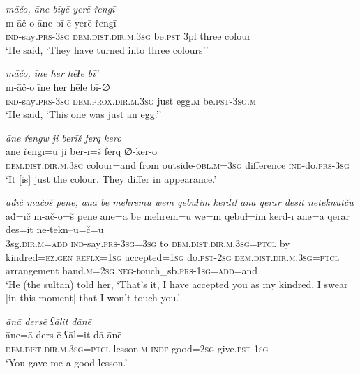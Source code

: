 \ea \label{ŽH.89}
\textit{māčo, āne bīyē yerē řengī} \\ 
\gll m-āč-o āne bī-ē yerē řengī \\ 
 \textsc{ind-}say\textsc{.prs}\textsc{-3sg} \textsc{dem.dist}\textsc{.dir}\textsc{.m}\textsc{.3sg} be\textsc{.pst} 3pl three colour \\ 
\glt `He said, ‘They have turned into three colours’'
\z 
 
\ea \label{ŽH.95}
\textit{māčo, īne her hēɫe bī’} \\ 
\gll m-āč-o īne her hēɫe bī-∅ \\ 
 \textsc{ind-}say\textsc{.prs}\textsc{-3sg} \textsc{dem.prox}\textsc{.dir}\textsc{.m}\textsc{.3sg} just egg\textsc{.m} be\textsc{.pst}\textsc{-3sg}\textsc{.m} \\ 
\glt `He said, ‘This one was just an egg.’'
\z 
 
\ea \label{ŽH.100}
\textit{āne řengw ji berīš ferq kero} \\ 
\gll āne řengī=ū ji ber-ī=š ferq ∅-ker-o \\ 
 \textsc{dem.dist}\textsc{.dir}\textsc{.m}\textsc{.3sg} colour=and from outside\textsc{-obl}\textsc{.m}\textsc{=3sg} difference \textsc{ind-}do\textsc{.prs}\textsc{-3sg} \\ 
\glt `It [is] just the colour. They differ in appearance.'
\z 
 
\ea \label{ŽH.103}
\textit{āđīč māčoš pene, ānā be mehremū wēm qebūɫim kerdī! ānā qerār desit neteknūtčū} \\ 
\gll āđ=īč m-āč-o=š pene āne=ā be mehrem=ū wē=m qebūɫ=im kerd-ī āne=ā qerār des=it ne-tekn--ū=č=ū \\ 
 3sg\textsc{.dir}\textsc{.m}\textsc{=add} \textsc{ind-}say\textsc{.prs}\textsc{-3sg}\textsc{=3sg} to \textsc{dem.dist}\textsc{.dir}\textsc{.m}\textsc{.3sg}=\textsc{ptcl} by kindred\textsc{=ez}\textsc{.gen} \textsc{reflx}\textsc{=1sg} accepted\textsc{=1sg} do\textsc{.pst}-\textsc{2sg} \textsc{dem.dist}\textsc{.dir}\textsc{.m}\textsc{.3sg}=\textsc{ptcl} arrangement hand\textsc{.m}\textsc{=\textsc{2sg}} \textsc{neg-}touch\_sb\textsc{.prs}\textsc{-1sg}\textsc{=add}=and \\ 
\glt `He (the sultan) told her, ‘That’s it, I have accepted you as my kindred. I swear [in this moment] that I won’t touch you.'
\z 
 
\ea \label{ŽH.104}
\textit{ānā dersē ʕālit dānē} \\ 
\gll āne=ā ders-ē ʕāl=it dā-ānē \\ 
 \textsc{dem.dist}\textsc{.dir}\textsc{.m}\textsc{.3sg}=\textsc{ptcl} lesson\textsc{.m}\textsc{-indf} good\textsc{=\textsc{2sg}} give\textsc{.pst}\textsc{-1sg} \\ 
\glt `You gave me a good lesson.'
\z 
 
